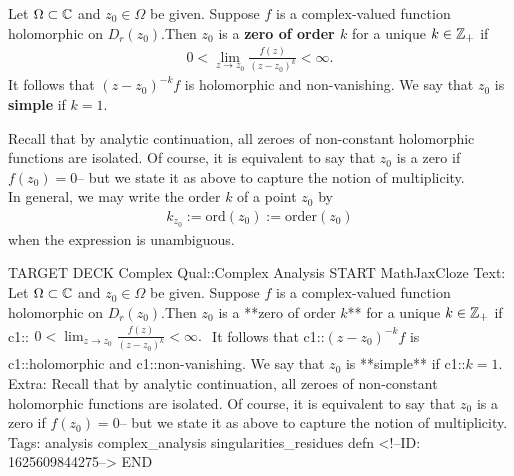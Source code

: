 \documentclass{memoir}
\begin{document}


\begin{defn}[Zero]
	Let \(\Omega \subset \mathbb{C}\) and \(z_0 \in \Omega \) be given. Suppose \(f\) is a complex-valued function holomorphic on \(D_r(z_0)\).Then \(z_0\) is a \textbf{zero of order \(k\)} for a unique \(k \in \mathbb{Z}_+\) if
	\begin{align*}
		0 < \lim_{z \to z_0} \frac{f(z)}{(z-z_0)^{k}} < \infty.
	\end{align*}
	It follows that \((z-z_0)^{-k}f\) is holomorphic and non-vanishing. We say that \(z_0\) is \textbf{simple} if \(k=1\).
\end{defn}
Recall that by analytic continuation, all zeroes of non-constant holomorphic functions are isolated. Of course, it is equivalent to say that \(z_0\) is a zero if \(f(z_0) = 0\)-- but we state it as above to capture the notion of multiplicity.\\

In general, we may write the order \(k\) of a point \(z_0\) by
\begin{align*}
	k_{z_0} := \textrm{ord}(z_0) := \textrm{order}(z_0)
\end{align*}
when the expression is unambiguous.

\begin{anki}
TARGET DECK
Complex Qual::Complex Analysis
START
MathJaxCloze
Text: Let \(\Omega \subset \mathbb{C}\) and \(z_0 \in \Omega \) be given. Suppose \(f\) is a complex-valued function holomorphic on \(D_r(z_0)\).Then \(z_0\) is a **zero of order \(k\)** for a unique \(k \in \mathbb{Z}_+\) if
 {{c1::\(\begin{align*}
         	0 < \lim_{z \to z_0} \frac{f(z)}{(z-z_0)^{k}} < \infty.
         \end{align*}\)}}
It follows that {{c1::\((z-z_0)^{-k}f\)}} is {{c1::holomorphic}} and {{c1::non-vanishing}}. We say that \(z_0\) is **simple** if {{c1::\(k=1\)}}.
Extra: Recall that by analytic continuation, all zeroes of non-constant holomorphic functions are isolated. Of course, it is equivalent to say that \(z_0\) is a zero if \(f(z_0) = 0\)-- but we state it as above to capture the notion of multiplicity.
Tags: analysis complex_analysis singularities_residues defn
<!--ID: 1625609844275-->
END
\end{anki}
\end{document}
